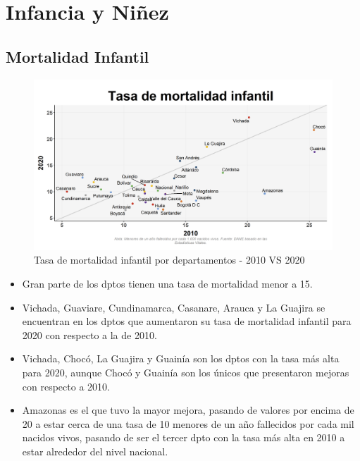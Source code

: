 
\section{Infancia y Niñez}
    \subsection{Mortalidad Infantil}

    \begin{figure}[H]
        \caption{Tasa de mortalidad infantil por departamentos - 2010 VS 2020 \label{map_result_2} }
        \begin{center}
        \includegraphics[width=\textwidth,keepaspectratio]{img/var_290_scatter_time.png}
        \end{center}
    \end{figure}
            \begin{itemize}
                    \item Gran parte de los dptos tienen una tasa de mortalidad menor a 15.
                    \item Vichada, Guaviare, Cundinamarca, Casanare, Arauca y La Guajira se encuentran en los dptos que aumentaron su tasa de mortalidad infantil para 2020 con respecto a la de 2010.
                    \item Vichada, Chocó, La Guajira y Guainía son los dptos con la tasa más alta para 2020, aunque Chocó y Guainía son los únicos que presentaron mejoras con respecto a 2010.
                    \item Amazonas es el que tuvo la mayor mejora, pasando de valores por encima de 20 a estar cerca de una tasa de 10 menores de un año fallecidos por cada mil nacidos vivos, pasando de ser el tercer dpto con la tasa más alta en 2010 a estar alrededor del nivel nacional.
                \end{itemize}

